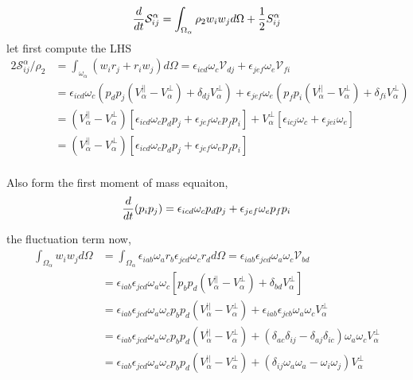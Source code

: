 \begin{equation}
    \frac{d}{d t} \mathcal{S}^\alpha_{ij}
    =  \int_{\Omega_\alpha} 
        \rho_2 w_i w_j
        d\Omega
        + \frac{1}{2} S^\alpha_{ij}
\end{equation}
let first compute the LHS
\begin{align*}
    2\mathcal{S}^\alpha_{ij} / \rho_2
    &= \int_{\omega_\alpha} (w_{i} r_j + r_i w_j)d\Omega 
    = \epsilon_{icd} \omega_c \mathcal{V}_{dj}
    + \epsilon_{jef} \omega_e \mathcal{V}_{fi}\\
    &= \epsilon_{icd} \omega_c (p_dp_j (V_\alpha^{||} - V_\alpha^\bot) + \delta_{dj} V_\alpha^\bot)
    + \epsilon_{jef} \omega_e (p_fp_i (V_\alpha^{||} - V_\alpha^\bot) + \delta_{fi} V_\alpha^\bot)\\
    &= (V_\alpha^{||} - V_\alpha^\bot)\left[
        \epsilon_{icd} \omega_c p_dp_j 
        + \epsilon_{jef} \omega_e p_fp_i
    \right]
    + V_\alpha^\bot \left[
        \epsilon_{icj} \omega_c 
        + \epsilon_{jei} \omega_e  
    \right]\\
    &= (V_\alpha^{||} - V_\alpha^\bot)\left[
        \epsilon_{icd} \omega_c p_dp_j 
        + \epsilon_{jef} \omega_e p_fp_i
    \right]\\
\end{align*}

Also form the first moment of mass equaiton, 
\begin{equation*}
    \frac{d}{d t} (p_ip_j)
    = 
    \epsilon_{icd} \omega_c p_dp_j 
    + \epsilon_{jef} \omega_e p_fp_i
\end{equation*}

the fluctuation term now, 
\begin{align*}
    \int_{\Omega_\alpha} 
    w_i w_j
    d\Omega
    &= 
    \int_{\Omega_\alpha} 
        \epsilon_{iab} \omega_a r_b  \epsilon_{jcd} \omega_c r_d
    d\Omega
    = 
    \epsilon_{iab} \epsilon_{jcd}
    \omega_a
    \omega_c
    \mathcal{V}_{bd} \\
    & = 
    \epsilon_{iab} \epsilon_{jcd}
    \omega_a
    \omega_c
    \left[p_bp_d (V_\alpha^{||} - V_\alpha^\bot) + \delta_{bd} V_\alpha^\bot\right] \\
    & = 
    \epsilon_{iab} \epsilon_{jcd}
    \omega_a
    \omega_c
    p_bp_d (V_\alpha^{||} - V_\alpha^\bot) 
    + \epsilon_{iab} \epsilon_{jcb}
    \omega_a
    \omega_c
     V_\alpha^\bot \\
    & = 
    \epsilon_{iab} \epsilon_{jcd}
    \omega_a
    \omega_c
    p_bp_d (V_\alpha^{||} - V_\alpha^\bot) 
    + (\delta_{ac}\delta_{ij} - \delta_{aj}\delta_{ic})
    \omega_a
    \omega_c
     V_\alpha^\bot \\
    & = 
    \epsilon_{iab} \epsilon_{jcd}
    \omega_a
    \omega_c
    p_bp_d (V_\alpha^{||} - V_\alpha^\bot) 
    + (\delta_{ij} 
    \omega_a
    \omega_a
     - \omega_i \omega_j)
     V_\alpha^\bot 
\end{align*}
    
